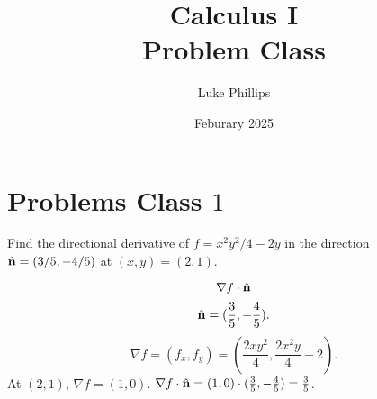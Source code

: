 \documentclass[10pt, a4paper]{article}
\title{Calculus I \\
    \large Problem Class}
\author{Luke Phillips}
\date{Feburary 2025}
\begin{document}
\maketitle

\newpage

\tableofcontents

\newpage

\section{Problems Class \texorpdfstring{$1$}{}}

\begin{problem}
    Find the directional derivative of $f = x ^ 2y ^ 2 / 4 - 2y$ in the direction $\hat{\mathbf{n}} = (3 / 5, -4 / 5)$ at $(x, y) = (2, 1)$.

    \begin{solution}
        \[
        \nabla f \cdot \hat{\mathbf{n}}
        \]
        \[
        \hat{\mathbf{n}} = (\frac{3}{5}, -\frac{4}{5}).
        \]
        \[
        \nabla f = (f_x, f_y) = (\frac{2xy ^ 2}{4}, \frac{2x ^ 2y}{4} - 2).
        \]
        At $(2, 1)$,
        $\nabla f = (1, 0)$.
        $\nabla f \cdot \hat{\mathbf{n}} = (1, 0) \cdot (\frac{3}{5}, -\frac{4}{5}) = \frac{3}{5}$.
    \end{solution}
\end{problem}
\end{document}
